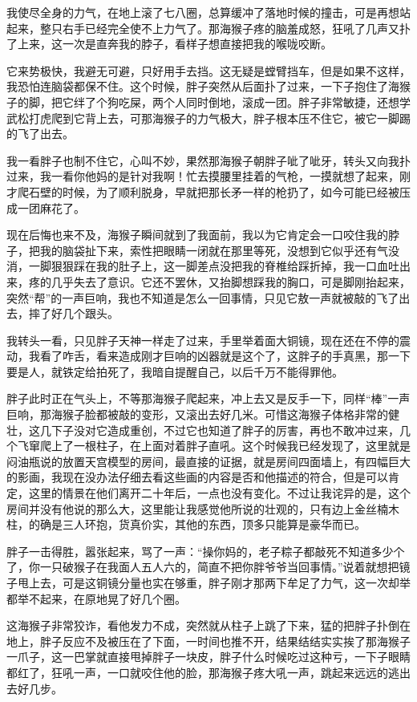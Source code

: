 我使尽全身的力气，在地上滚了七八圈，总算缓冲了落地时候的撞击，可是再想站起来，整只右手已经完全使不上力气了。那海猴子疼的脑羞成怒，狂吼了几声又扑了上来，这一次是直奔我的脖子，看样子想直接把我的喉咙咬断。

它来势极快，我避无可避，只好用手去挡。这无疑是螳臂挡车，但是如果不这样，我恐怕连脑袋都保不住。这个时候，胖子突然从后面扑了过来，一下子抱住了海猴子的脚，把它绊了个狗吃屎，两个人同时倒地，滚成一团。胖子非常敏捷，还想学武松打虎爬到它背上去，可那海猴子的力气极大，胖子根本压不住它，被它一脚踢的飞了出去。

我一看胖子也制不住它，心叫不妙，果然那海猴子朝胖子呲了呲牙，转头又向我扑过来，我一看你他妈的是针对我啊！忙去摸腰里挂着的气枪，一摸就想了起来，刚才爬石壁的时候，为了顺利脱身，早就把那长矛一样的枪扔了，如今可能已经被压成一团麻花了。

现在后悔也来不及，海猴子瞬间就到了我面前，我以为它肯定会一口咬住我的脖子，把我的脑袋扯下来，索性把眼睛一闭就在那里等死，没想到它似乎还有气没消，一脚狠狠踩在我的肚子上，这一脚差点没把我的脊椎给踩折掉，我一口血吐出来，疼的几乎失去了意识。它还不罢休，又抬脚想踩我的胸口，可是脚刚抬起来，突然“帮”的一声巨响，我也不知道是怎么一回事情，只见它敖一声就被敲的飞了出去，摔了好几个跟头。

我转头一看，只见胖子天神一样走了过来，手里举着面大铜镜，现在还在不停的震动，我看了咋舌，看来造成刚才巨响的凶器就是这个了，这胖子的手真黑，那一下要是人，就铁定给拍死了，我暗自提醒自己，以后千万不能得罪他。

胖子此时正在气头上，不等那海猴子爬起来，冲上去又是反手一下，同样“棒”一声巨响，那海猴子脸都被敲的变形，又滚出去好几米。可惜这海猴子体格非常的健壮，这几下子没对它造成重创，不过它也知道了胖子的厉害，再也不敢冲过来，几个飞窜爬上了一根柱子，在上面对着胖子直吼。这个时候我已经发现了，这里就是闷油瓶说的放置天宫模型的房间，最直接的证据，就是房间四面墙上，有四幅巨大的影画，我现在没办法仔细去看这些画的内容是否和他描述的符合，但是可以肯定，这里的情景在他们离开二十年后，一点也没有变化。不过让我诧异的是，这个房间并没有他说的那么大，这里能让我感觉他所说的壮观的，只有边上金丝楠木柱，的确是三人环抱，货真价实，其他的东西，顶多只能算是豪华而已。

胖子一击得胜，嚣张起来，骂了一声：“操你妈的，老子粽子都敲死不知道多少个了，你一只破猴子在我面人五人六的，简直不把你胖爷爷当回事情。”说着就想把镜子甩上去，可是这铜镜分量也实在够重，胖子刚才那两下牟足了力气，这一次却举都举不起来，在原地晃了好几个圈。

这海猴子非常狡诈，看他发力不成，突然就从柱子上跳了下来，猛的把胖子扑倒在地上，胖子反应不及被压在了下面，一时间也推不开，结果结结实实挨了那海猴子一爪子，这一巴掌就直接甩掉胖子一块皮，胖子什么时候吃过这种亏，一下子眼睛都红了，狂吼一声，一口就咬住他的脸，那海猴子疼大吼一声，跳起来远远的逃出去好几步。

